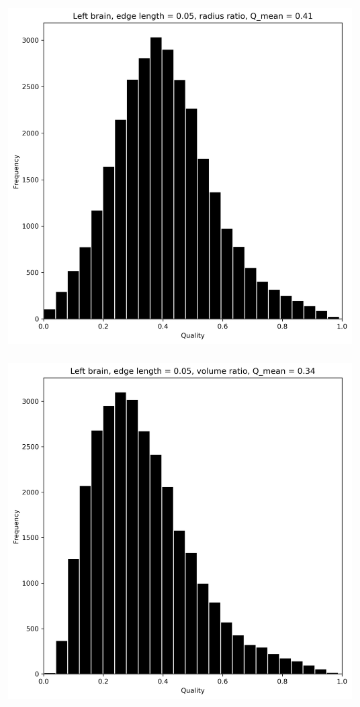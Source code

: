 \documentclass[acmtog]{acmart}
\begin{document}
\begin{figure}[H]
  \centering
  \begin{subfigure}{0.22\textwidth}
    \centering
    \includegraphics[width=\textwidth]{Images/histograms/Left brain, edge length = 0.05, radius ratio.png}
  \end{subfigure}\hfill
  \begin{subfigure}{0.22\textwidth}
    \centering
    \includegraphics[width=\textwidth]{Images/histograms/Left brain, edge length = 0.05, volume ratio.png}

\end{subfigure}
\end{figure}
\end{document}
